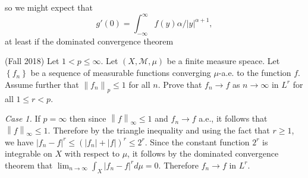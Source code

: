 \documentclass{exam}
\theoremstyle{problemstyle}
\newcommand{\norm}[1]{\left\lVert#1\right\rVert} %
\newcommand{\1}[1]{\textbf{1}_{\left[#1\right]}} %
\begin{document}
\begin{questions}
\begin{parts}
\begin{solution}
        
        so we might expect that
        \[ g'(0) = \int_{-\infty}^\infty f(y) \alpha / |y|^{\alpha+1}, \]
        at least if the dominated convergence theorem
    \end{solution}
\end{parts}

\question (Fall 2018)
  Let $1<p\leq \infty$. Let $(X,\mathcal{M},\mu)$ be a finite measure speace. Let $\left\{ f_{n} \right\}$ be a sequence of measurable functions converging $\mu$-a.e. to the function $f$. Assume further that $\norm{f_{n}}_{p}\leq 1$ for all $n$. Prove that $f_{n}\to f$ as $n\to \infty$ in $L^{r}$ for all $1\leq r<p$.
\begin{solution}
  \textit{Case 1.} If $p=\infty$ then since $\norm{f}_{\infty}\leq 1$ and $f_{n}\to f$ a.e., it follows that $\norm{f}_{\infty}\leq 1$. Therefore by the triangle inequality and using the fact that $r\geq 1$, we have $|f_{n}-f|^{r}\leq (|f_{n}| + |f| )^{r}\leq 2^{r}$. Since the constant function $2^{r}$ is integrable on $X$ with respect to $\mu$, it follows by the dominated convergence theorem that $\lim_{n\to\infty}\int_{X} |f_{n}-f|^{r}d\mu = 0$. Therefore $f_{n}\to f$ in $L^{r}$.


\end{solution}
\end{questions}
\end{document}
